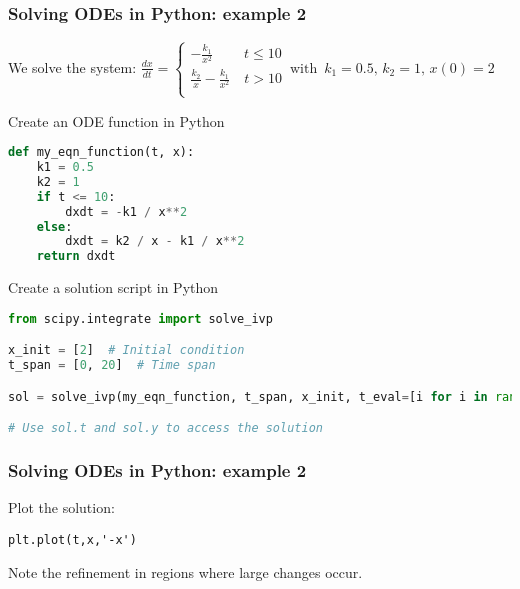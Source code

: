 \begin{frame}[fragile]
  \frametitle{Solving ODEs in Python: example 2}
  We solve the system: $\displaystyle \frac{dx}{dt} = \begin{cases}
    -\frac{k_1}{x^2} \quad\ \quad t \leq 10\\
    \frac{k_2}{x} - \frac{k_1}{x^2} \quad  t > 10\\
 \end{cases}\, \text{with }\, k_1 = 0.5,\, k_2 = 1,\, x(0) = 2$
 \vspace*{0ex}
  \begin{block}{Create an ODE function in Python}
    \begin{lstlisting}[language=Python,basicstyle=\tiny]
def my_eqn_function(t, x):
    k1 = 0.5
    k2 = 1
    if t <= 10:
        dxdt = -k1 / x**2
    else:
        dxdt = k2 / x - k1 / x**2
    return dxdt
\end{lstlisting}
  \end{block}
  \pause
  \begin{block}{Create a solution script in Python}
    \begin{lstlisting}[language=Python,basicstyle=\tiny]
from scipy.integrate import solve_ivp

x_init = [2]  # Initial condition
t_span = [0, 20]  # Time span

sol = solve_ivp(my_eqn_function, t_span, x_init, t_eval=[i for i in range(21)], rtol=1e-8, atol=1e-8)

# Use sol.t and sol.y to access the solution
\end{lstlisting}
  \end{block}
\vfill
\end{frame}


{\nologo
\begin{frame}[fragile]
  \frametitle{Solving ODEs in Python: example 2}
  Plot the solution:
  \begin{lstlisting}
plt.plot(t,x,'-x')
  \end{lstlisting}
  \pause
  \begin{center}
  \end{center}
  Note the refinement in regions where large changes occur.
\end{frame}
}

